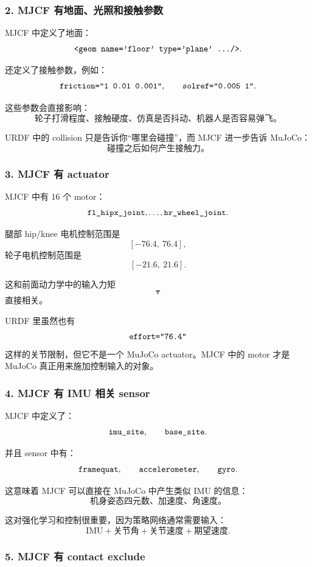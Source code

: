 \documentclass[UTF8,11pt,a4paper]{ctexart}
\newcommand{\bs}[1]{\bm{#1}}
\begin{document}
\subsubsection{2. MJCF 有地面、光照和接触参数}

MJCF 中定义了地面：
\[
\text{\texttt{<geom name='floor' type='plane' .../>}}.
\]

还定义了接触参数，例如：
\[
\text{\texttt{friction="1 0.01 0.001"}},
\qquad
\text{\texttt{solref="0.005 1"}}.
\]

这些参数会直接影响：
\[
\text{轮子打滑程度、接触硬度、仿真是否抖动、机器人是否容易弹飞。}
\]

URDF 中的 collision 只是告诉你“哪里会碰撞”，而 MJCF 进一步告诉 MuJoCo：
\[
\text{碰撞之后如何产生接触力。}
\]

\subsubsection{3. MJCF 有 actuator}

MJCF 中有 16 个 motor：
\[
\text{\texttt{fl\_hipx\_joint}},\ldots,\text{\texttt{hr\_wheel\_joint}}.
\]

腿部 hip/knee 电机控制范围是
\[
[-76.4,\ 76.4],
\]
轮子电机控制范围是
\[
[-21.6,\ 21.6].
\]

这和前面动力学中的输入力矩
\[
\bs \tau
\]
直接相关。

URDF 里虽然也有
\[
\text{\texttt{effort="76.4"}}
\]
这样的关节限制，但它不是一个 MuJoCo actuator。MJCF 中的 motor 才是 MuJoCo 真正用来施加控制输入的对象。

\subsubsection{4. MJCF 有 IMU 相关 sensor}

MJCF 中定义了：
\[
\text{\texttt{imu\_site}},\qquad
\text{\texttt{base\_site}}.
\]

并且 sensor 中有：
\[
\text{\texttt{framequat}},\qquad
\text{\texttt{accelerometer}},\qquad
\text{\texttt{gyro}}.
\]

这意味着 MJCF 可以直接在 MuJoCo 中产生类似 IMU 的信息：
\[
\text{机身姿态四元数、加速度、角速度。}
\]

这对强化学习和控制很重要，因为策略网络通常需要输入：
\[
\text{IMU}+\text{关节角}+\text{关节速度}+\text{期望速度}.
\]

\subsubsection{5. MJCF 有 contact exclude}
\end{document}
